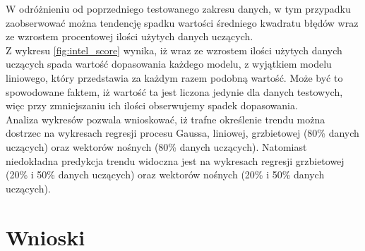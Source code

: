 W odróżnieniu od poprzedniego testowanego zakresu danych, w tym przypadku zaobserwować można tendencję spadku wartości średniego kwadratu błędów wraz ze wzrostem procentowej ilości użytych danych uczących.\\

Z wykresu \ref{fig:intel_score} wynika, iż wraz ze wzrostem ilości użytych danych uczących spada wartość dopasowania każdego modelu, z wyjątkiem modelu liniowego, który przedstawia za każdym razem podobną wartość.
Może być to spowodowane faktem, iż wartość ta jest liczona jedynie dla danych testowych, więc przy zmniejszaniu ich ilości obserwujemy spadek dopasowania.\\

Analiza wykresów pozwala wnioskować, iż trafne określenie trendu można dostrzec na wykresach regresji procesu Gaussa, liniowej, grzbietowej (80\% danych uczących) oraz wektorów nośnych (80\% danych uczących).
Natomiast niedokładna predykcja trendu widoczna jest na wykresach regresji grzbietowej (20\% i 50\% danych uczących) oraz wektorów nośnych (20\% i 50\% danych uczących).\\

\newpage

\section{Wnioski}

